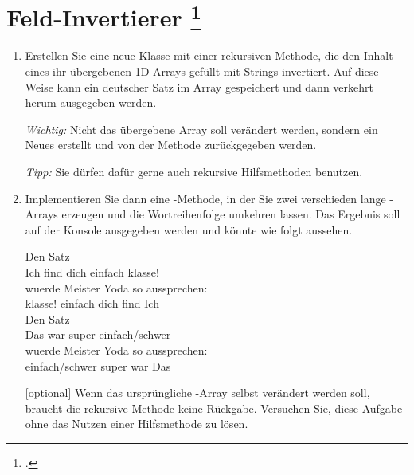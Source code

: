 \documentclass{bschlangaul-aufgabe}
\begin{document}

\section{Feld-Invertierer
\footcite[Aufgabenblatt 2: Rekursion, Sortieren, Komplexität, Arrays und
Rekursion, Diese Aufgabe stammt aus der Vorlesung Konzepte der
Programmierung von Prof. Bernhard Westfechtel der Universität Bayreuth,
WS 2017/18, Übungsblatt 8 und wurde dankenswerterweise zur Verwendung in
diesem Aufgabenblatt zur Verfügung gestellt, Aufgabe 1]{aud:ab:2}}

\begin{enumerate}

%

\item Erstellen Sie eine neue Klasse  mit
einer rekursiven Methode, die den Inhalt eines ihr übergebenen 1D-Arrays
gefüllt mit Strings invertiert. Auf diese Weise kann \zB ein deutscher
Satz im Array gespeichert und dann verkehrt herum ausgegeben werden.

\emph{Wichtig:} Nicht das übergebene Array soll verändert werden,
sondern ein Neues erstellt und von der Methode zurückgegeben werden.

\emph{Tipp:} Sie dürfen dafür gerne auch rekursive Hilfsmethoden
benutzen.

%

\item Implementieren Sie dann eine -Methode, in der Sie
zwei verschieden lange -Arrays erzeugen und die
Wortreihenfolge umkehren lassen. Das Ergebnis soll auf der Konsole
ausgegeben werden und könnte \zB wie folgt aussehen.

\bigskip

{
\ttfamily
Den Satz\\
Ich find dich einfach klasse!\\
wuerde Meister Yoda so aussprechen:\\
klasse! einfach dich find Ich\\

Den Satz\\
Das war super einfach/schwer\\
wuerde Meister Yoda so aussprechen:\\
einfach/schwer super war Das
}

\bigskip

[optional] Wenn das ursprüngliche -Array selbst
verändert werden soll, braucht die rekursive Methode keine Rückgabe.
Versuchen Sie, diese Aufgabe ohne das Nutzen einer Hilfsmethode zu
lösen.

\begin{bAntwort}
\end{bAntwort}
\end{enumerate}
\end{document}
